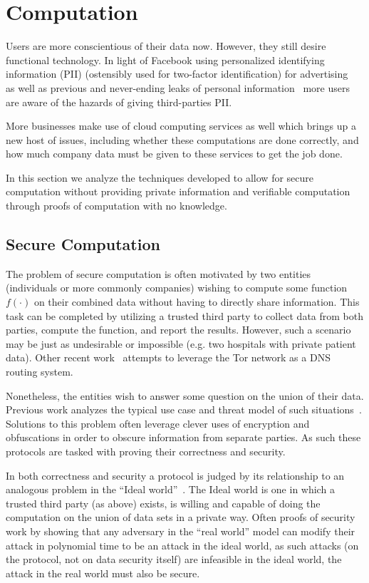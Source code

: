 \section{Computation} \label{sec:computation}
Users are more conscientious of their data now. However, they still desire
functional technology. In light of Facebook using personalized identifying
information (PII) (ostensibly used for two-factor identification) for
advertising~\cite{venkatadri1investigating} as well as previous and never-ending
leaks of personal information~\cite{fung_2017, granville_2018} more users are
aware of the hazards of giving third-parties PII.

More businesses make use of cloud computing services as well which brings up a
new host of issues, including whether these computations are done correctly, and
how much company data must be given to these services to get the job done. 

In this section we analyze the techniques developed to allow for secure
computation without providing private information and verifiable computation
through proofs of computation with no knowledge.

\subsection{Secure Computation} \label{ssec:secureComputation}
The problem of secure computation is often motivated by two entities
(individuals or more commonly companies) wishing to compute some function
$f(\cdot)$ on their combined data without having to directly share information.
This task can be completed by utilizing a trusted third party to collect data
from both parties, compute the function, and report the results. However, such a
scenario may be just as undesirable or impossible (e.g. two hospitals with
private patient data). Other recent work~\cite{scaife2018oniondns} attempts to
leverage the Tor network as a DNS routing system.

Nonetheless, the entities wish to answer some question on the union of their
data. Previous work analyzes the typical use case and threat model of such
situations~\cite{yao1982protocols, lindell2005secure}. Solutions to this problem
often leverage clever uses of encryption and obfuscations in order to obscure
information from separate parties. As such these protocols are tasked with
proving their correctness and security. 

In both correctness and security a protocol is judged by its relationship to an
analogous problem in the ``Ideal world''~\cite{lindell2005secure}. The Ideal
world is one in which a trusted third party (as above) exists, is willing and
capable of doing the computation on the union of data sets in a private way.
Often proofs of security work by showing that any adversary in the ``real
world'' model can modify their attack in polynomial time to be an attack in the
ideal world, as such attacks (on the protocol, not on data security itself) are
infeasible in the ideal world, the attack in the real world must also be secure.

